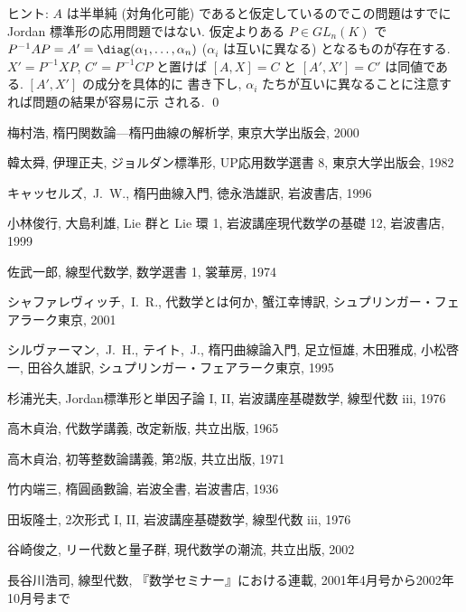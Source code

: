 \documentclass[12pt,twoside]{jarticle}
\begin{document}
\noindent
ヒント: $A$ は半単純 (対角化可能) であると仮定しているのでこの問題はすでに 
Jordan 標準形の応用問題ではない.  仮定よりある $P\in GL_n(K)$ 
で $P^{-1}AP=A'=\diag(\alpha_1,\dots,\alpha_n)$ ($\alpha_i$ は互いに異なる) 
となるものが存在する.  $X'=P^{-1}XP$, $C'=P^{-1}CP$ と置けば $[A,X]=C$ 
と $[A',X']=C'$ は同値である.  $[A',X']$ の成分を具体的に
書き下し, $\alpha_i$ たちが互いに異なることに注意すれば問題の結果が容易に示
される.
\qed


\begin{thebibliography}{ABCD}

梅村浩, 楕円関数論---楕円曲線の解析学, 東京大学出版会, 2000

韓太舜, 伊理正夫, ジョルダン標準形, UP応用数学選書 8, 東京大学出版会, 1982

キャッセルズ,~J.~W., 楕円曲線入門, 徳永浩雄訳, 岩波書店, 1996

小林俊行, 大島利雄, Lie 群と Lie 環 1, 岩波講座現代数学の基礎 12,
岩波書店, 1999

佐武一郎, 線型代数学, 数学選書 1, 裳華房, 1974

シャファレヴィッチ,~I.~R., 代数学とは何か, 蟹江幸博訳, シュプリンガー・フェ
アラーク東京, 2001

シルヴァーマン,~J.~H., テイト,~J., 楕円曲線論入門, 
足立恒雄, 木田雅成, 小松啓一, 田谷久雄訳, 
シュプリンガー・フェアラーク東京, 1995

杉浦光夫, Jordan標準形と単因子論 I, II, 岩波講座基礎数学, 線型代数 iii, 1976

高木貞治, 代数学講義, 改定新版, 共立出版, 1965

高木貞治, 初等整数論講義, 第2版, 共立出版, 1971

竹内端三, 楕圓凾數論, 岩波全書, 岩波書店, 1936

田坂隆士, 2次形式 I, II, 岩波講座基礎数学, 線型代数 iii, 1976

谷崎俊之, リー代数と量子群, 現代数学の潮流, 共立出版, 2002

長谷川浩司, 線型代数, 『数学セミナー』における連載, 
2001年4月号から2002年10月号まで


\end{thebibliography}
\end{document}
